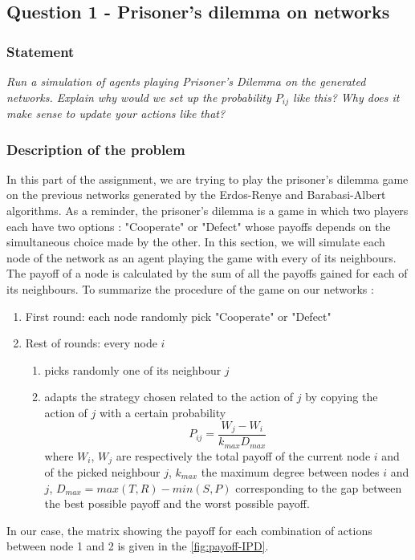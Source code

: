 \documentclass{article}
\begin{document}
\subsection{Question 1 - Prisoner's dilemma on networks}

\subsubsection*{Statement}
\textit{Run a simulation of agents playing Prisoner's Dilemma on the generated networks. Explain why would we set up the probability $P_{ij}$ like this? Why does it make sense to update your actions like that?} 

\subsubsection{Description of the problem}
In this part of the assignment, we are trying to play the prisoner's dilemma game on the previous networks generated by the Erdos-Renye and Barabasi-Albert algorithms. As a reminder, the prisoner's dilemma is a game in which two players each have two options : "Cooperate" or "Defect" whose payoffs depends on the simultaneous choice made by the other. In this section, we will simulate each node of the network as an agent playing the game with every of its neighbours. The payoff of a node is calculated by the sum of all the payoffs gained for each of its neighbours. To summarize the procedure of the game on our networks : 
\begin{enumerate}
\item First round: each node randomly pick "Cooperate" or "Defect" 
\item Rest of rounds: every node $i$
\begin{enumerate}
\item picks randomly one of its neighbour $j$
\item adapts the strategy chosen related to the action of $j$ by copying the action of $j$  with a certain probability $$ P_{ij} = \frac{W_{j}-W_{i}}{k_{max} D_{max}} $$ where $W_{i}$, $W_{j}$ are respectively the total payoff of the current node $i$ and of the picked neighbour $j$, $k_{max}$ the maximum degree between nodes $i$ and $j$, $D_{max} = max(T,R) - min(S,P)$ corresponding to the gap between the best possible payoff and the worst possible payoff.  
\end{enumerate} 
\end{enumerate}  

In our case, the matrix showing the payoff for each combination of actions between node 1 and 2 is given in the \autoref{fig:payoff-IPD}.
 
\end{document}
